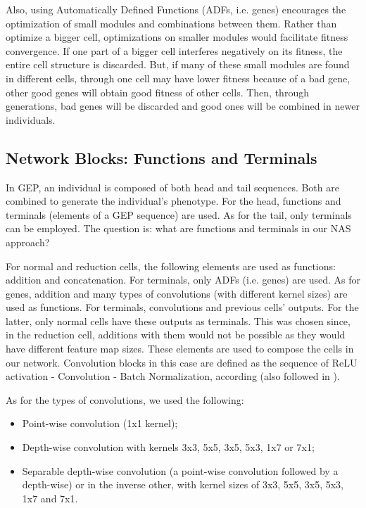\documentclass[conference]{IEEEtran}
\begin{document}
	Also, using Automatically Defined Functions (ADFs, i.e. genes) encourages the optimization of small modules and combinations between them.
	Rather than optimize a bigger cell, optimizations on smaller modules would facilitate fitness convergence.
	If one part of a bigger cell interferes negatively on its fitness, the entire cell structure is discarded.
	But, if many of these small modules are found in different cells, through one cell may have lower fitness because of a bad gene, other good genes will obtain good fitness of other cells.
	Then, through generations, bad genes will be discarded and good ones will be combined in newer individuals.
	
	\subsection{Network Blocks: Functions and Terminals}
	
	In GEP, an individual is composed of both head and tail sequences.
	Both are combined to generate the individual's phenotype.
	For the head, functions and terminals (elements of a GEP sequence) are used.
	As for the tail, only terminals can be employed.
	The question is: what are functions and terminals in our NAS approach?
	
	For normal and reduction cells, the following elements are used as functions: addition and concatenation.
	For terminals, only ADFs (i.e. genes) are used.
	As for genes, addition and many types of convolutions (with different kernel sizes) are used as functions.
	For terminals, convolutions and previous cells' outputs. For the latter, only normal cells have these outputs as terminals. This was chosen since, in the reduction cell, additions with them would not be possible as they would have different feature map sizes.
	These elements are used to compose the cells in our network.
	Convolution blocks in this case are defined as the sequence of ReLU activation - Convolution - Batch Normalization, according \cite{he2016identity} (also followed in \cite{zoph2017learning}). 
	
	As for the types of convolutions, we used the following:
	\begin{itemize}
		\item Point-wise convolution (1x1 kernel);
		\item Depth-wise convolution with kernels 3x3, 5x5, 3x5, 5x3, 1x7 or 7x1;
		\item Separable depth-wise convolution (a point-wise convolution followed by a depth-wise) or in the inverse other, with kernel sizes of 3x3, 5x5, 3x5, 5x3, 1x7 and 7x1.
	\end{itemize}
	
\end{document}
